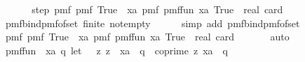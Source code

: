\begin{isabellebody}
\ \ \isanewline
\ \ \isamarkupfalse%
\ step{\isacharunderscore}{\kern0pt}{}{\isacharcolon}{\kern0pt}\ {\isachardoublequoteopen}pmf\ {\isacharquery}{\kern0pt}pmf\ True\ {\isacharequal}{\kern0pt}\ {\isacharparenleft}{\kern0pt}{\isasymSum}xa{\isasymin}{\isacharquery}{\kern0pt}{\isasymK}{\isachardot}{\kern0pt}\ pmf\ {\isacharparenleft}{\kern0pt}{\isacharquery}{\kern0pt}pmf{\isacharunderscore}{\kern0pt}fun\ xa{\isacharparenright}{\kern0pt}\ True{\isacharparenright}{\kern0pt}\ {\isacharslash}{\kern0pt}\ real\ {\isacharparenleft}{\kern0pt}card\ {\isacharquery}{\kern0pt}{\isasymK}{\isacharparenright}{\kern0pt}{\isachardoublequoteclose}\isanewline
\ \ \ \ \isamarkupfalse%
\ pmf{\isacharunderscore}{\kern0pt}bind{\isacharunderscore}{\kern0pt}pmf{\isacharunderscore}{\kern0pt}of{\isacharunderscore}{\kern0pt}set\ {\isasymK}{\isacharunderscore}{\kern0pt}finite\ {\isasymK}{\isacharunderscore}{\kern0pt}not{\isacharunderscore}{\kern0pt}empty\isanewline
\ \ \ \ \isamarkupfalse%
\ {\isacharparenleft}{\kern0pt}simp\ add{\isacharcolon}{\kern0pt}\ pmf{\isacharunderscore}{\kern0pt}bind{\isacharunderscore}{\kern0pt}pmf{\isacharunderscore}{\kern0pt}of{\isacharunderscore}{\kern0pt}set{\isacharparenright}{\kern0pt}\isanewline
\ \ \isamarkupfalse%
\ \isamarkupfalse%
\ {\isachardoublequoteopen}pmf\ {\isacharquery}{\kern0pt}pmf\ True\ {\isacharequal}{\kern0pt}\ {\isacharparenleft}{\kern0pt}{\isasymSum}xa{\isasymin}{\isacharquery}{\kern0pt}{\isasymK}{\isachardot}{\kern0pt}\ pmf\ {\isacharparenleft}{\kern0pt}{\isacharquery}{\kern0pt}pmf{\isacharunderscore}{\kern0pt}fun{\isacharprime}{\kern0pt}\ xa{\isacharparenright}{\kern0pt}\ True{\isacharparenright}{\kern0pt}\ {\isacharslash}{\kern0pt}\ real\ {\isacharparenleft}{\kern0pt}card\ {\isacharquery}{\kern0pt}{\isasymK}{\isacharparenright}{\kern0pt}{\isachardoublequoteclose}\isanewline
\ \ \ \ \isamarkupfalse%
\ auto\isanewline
\isanewline
\ \ \isamarkupfalse%
\ {\isacharquery}{\kern0pt}pmf{\isacharunderscore}{\kern0pt}fun{\isacharprime}{\kern0pt}{\isacharprime}{\kern0pt}\ {\isacharequal}{\kern0pt}\ {\isachardoublequoteopen}{\isasymlambda}xa{\isachardot}{\kern0pt}\ {\isacharparenleft}{\kern0pt}{\isasymlambda}q{\isachardot}{\kern0pt}\ let\ {\isasymZ}\ {\isacharequal}{\kern0pt}\ {\isacharbraceleft}{\kern0pt}z{\isachardot}{\kern0pt}\ z\ {\isacharless}{\kern0pt}\ xa\ {\isacharasterisk}{\kern0pt}\ q\ {\isasymand}\ coprime\ z\ {\isacharparenleft}{\kern0pt}xa\ {\isacharasterisk}{\kern0pt}\ q{\isacharparenright}{\kern0pt}{\isacharbraceright}{\kern0pt}\isanewline

\end{isabellebody}
